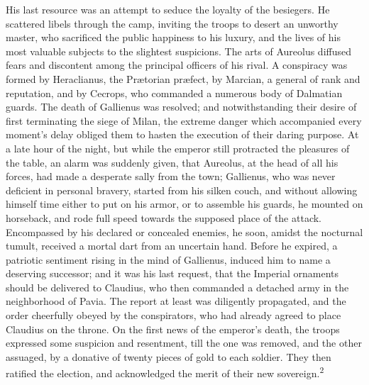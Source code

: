 
His last resource was an attempt to seduce the loyalty of the
besiegers. He scattered libels through the camp, inviting the
troops to desert an unworthy master, who sacrificed the public
happiness to his luxury, and the lives of his most valuable
subjects to the slightest suspicions. The arts of Aureolus
diffused fears and discontent among the principal officers of his
rival. A conspiracy was formed by Heraclianus, the Prætorian
præfect, by Marcian, a general of rank and reputation, and by
Cecrops, who commanded a numerous body of Dalmatian guards. The
death of Gallienus was resolved; and notwithstanding their desire
of first terminating the siege of Milan, the extreme danger which
accompanied every moment’s delay obliged them to hasten the
execution of their daring purpose. At a late hour of the night,
but while the emperor still protracted the pleasures of the
table, an alarm was suddenly given, that Aureolus, at the head of
all his forces, had made a desperate sally from the town;
Gallienus, who was never deficient in personal bravery, started
from his silken couch, and without allowing himself time either
to put on his armor, or to assemble his guards, he mounted on
horseback, and rode full speed towards the supposed place of the
attack. Encompassed by his declared or concealed enemies, he
soon, amidst the nocturnal tumult, received a mortal dart from an
uncertain hand. Before he expired, a patriotic sentiment rising
in the mind of Gallienus, induced him to name a deserving
successor; and it was his last request, that the Imperial
ornaments should be delivered to Claudius, who then commanded a
detached army in the neighborhood of Pavia. The report at least
was diligently propagated, and the order cheerfully obeyed by the
conspirators, who had already agreed to place Claudius on the
throne. On the first news of the emperor’s death, the troops
expressed some suspicion and resentment, till the one was
removed, and the other assuaged, by a donative of twenty pieces
of gold to each soldier. They then ratified the election, and
acknowledged the merit of their new sovereign.\textsuperscript{2}

